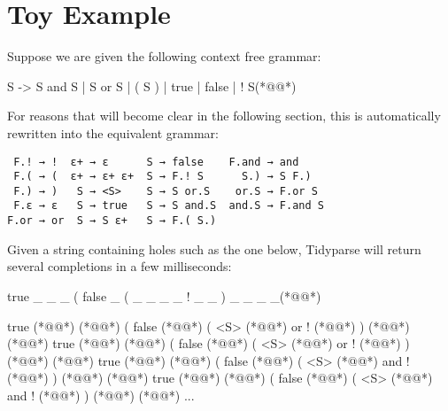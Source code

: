 \documentclass[sigplan,review,anonymous,acmsmall]{acmart}\settopmatter{printfolios=false,printccs=false,printacmref=false}
\begin{document}
%

    \section{Toy Example}

    Suppose we are given the following context free grammar:

\begin{tidyinput}
S -> S and S | S or S | ( S ) | true | false | ! S(*@\caret{ }@*)
\end{tidyinput}

    \noindent For reasons that will become clear in the following section, this is automatically rewritten into the equivalent grammar:

    \begin{verbatim}
 F.! → !  ε+ → ε      S → false    F.and → and
 F.( → (  ε+ → ε+ ε+  S → F.! S      S.) → S F.)
 F.) → )   S → <S>    S → S or.S    or.S → F.or S
 F.ε → ε   S → true   S → S and.S  and.S → F.and S
F.or → or  S → S ε+   S → F.( S.)
    \end{verbatim}

%

    \noindent Given a string containing holes such as the one below, Tidyparse will return several completions in a few milliseconds:

\begin{tidyinput}
true _ _ _ ( false _ ( _ _ _ _ ! _ _ ) _ _ _ _(*@\caret{ }@*)
\end{tidyinput}

\begin{tidyoutput}
true (*@@*) (*@\hlorange{!}@*) ( false (*@@*) ( <S> (*@\hlorange{)}@*) or ! (*@@*) ) (*@@*) (*@@*)
true (*@@*) (*@\hlorange{!}@*) ( false (*@@*) ( <S> (*@\hlorange{)}@*) or ! (*@@*) ) (*@@*) (*@@*)
true (*@@*) (*@\hlorange{!}@*) ( false (*@@*) ( <S> (*@\hlorange{)}@*) and ! (*@@*) ) (*@@*) (*@@*)
true (*@@*) (*@\hlorange{!}@*) ( false (*@@*) ( <S> (*@\hlorange{)}@*) and ! (*@@*) ) (*@@*) (*@@*)
...
\end{tidyoutput}
\end{document}
